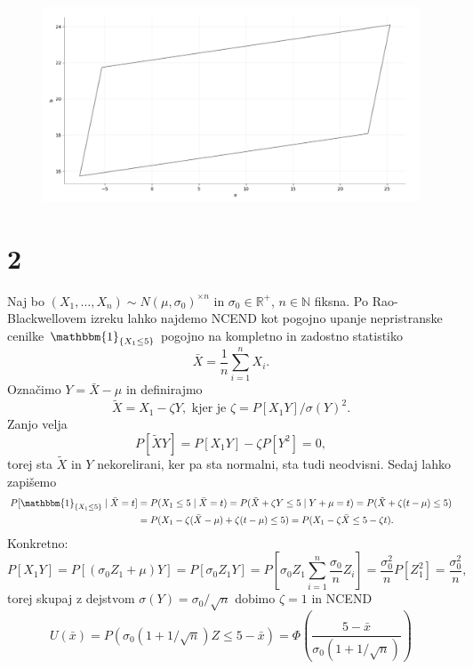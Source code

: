 \documentclass[ letterpaper, titlepage, fleqn]{article}
\newcommand{\R}{\mathbb R}
\newcommand{\N}{\mathbb N}
\newcommand{\ind}{\mathbbm{1}}
\begin{document}
\begin{center}
\begin{figure}[h]
\begin{center}
\includegraphics[width=15cm]{graphics/ConfidenceParalelogram.png}
\end{center}
\end{figure}
\end{center}


\section{2}
Naj bo $(X_1, \dots, X_n) \sim N(\mu, \sigma_0)^{\times n}$ in $\sigma_0 \in \R^+$, $n\in\N$ fiksna. Po Rao-Blackwellovem izreku lahko najdemo NCEND kot pogojno upanje nepristranske cenilke $\ind_{\{X_1 \leq 5\}}$  pogojno na kompletno in zadostno statistiko
$$\bar{X} = \frac{1}{n} \sum_{i=1}^n X_i.$$
Označimo $Y = \bar{X} - \mu$ in definirajmo
$$\tilde{X} = X_1 - \zeta Y, \text{ kjer je } \zeta = P[X_1Y] / \sigma(Y)^2.$$
Zanjo velja
$$P[\tilde{X}Y] = P[X_1Y] - \zeta P[Y^2] = 0,$$
torej sta $\tilde{X}$ in $Y$ nekorelirani, ker pa sta normalni, sta tudi neodvisni. 
Sedaj lahko zapišemo
\begin{equation*}
\begin{aligned}
P[\ind_{\{X_1 \leq 5\}} \mid \bar{X} = t] &= P(X_1 \leq 5 \mid \bar{X} = t) 
= P(\tilde{X} + \zeta Y \leq 5 \mid Y + \mu = t) = P(\tilde{X} + \zeta (t - \mu) \leq 5) \\
&= P(X_1 - \zeta (\bar{X} - \mu) + \zeta(t - \mu) \leq 5) = P(X_1 - \zeta \bar{X} \leq 5 - \zeta t).
\end{aligned}
\end{equation*}
Konkretno:
\begin{equation*}
P[X_1Y] = P[(\sigma_0 Z_1 + \mu)Y] = P[\sigma_0 Z_1 Y] = P[\sigma_0 Z_1 \sum_{i=1}^n \frac{\sigma_0}{n} Z_i] = \frac{\sigma_0^2}{n} P[Z_1^2]  = \frac{\sigma_0^2}{n},
\end{equation*}
torej skupaj z dejstvom $\sigma(Y) = \sigma_0 / \sqrt{n}$ dobimo $\zeta = 1$ in NCEND
$$U(\bar{x}) = P(\sigma_0 (1 + 1/\sqrt{n})Z \leq 5 - \bar{x}) = \Phi\left(\frac{5 - \bar{x}}{\sigma_0(1 + 1/\sqrt{n})}\right)$$
\end{document}
